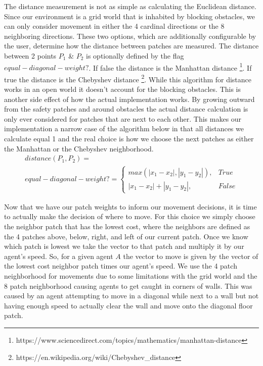 \documentclass[12pt,letterpaper]{article}
\begin{document}
The distance measurement is not as simple as calculating the Euclidean distance.  Since our environment is a grid world that is inhabited by blocking obstacles, we can only consider movement in either the 4 cardinal directions or the 8 neighboring directions.  These two options, which are additionally configurable by the user, determine how the distance between patches are measured.  The distance between 2 points $P_1$ \& $P_2$ is optionally defined by the flag $equal-diagonal-weight?$.  If false the distance is the Manhattan distance \footnote{ https://www.sciencedirect.com/topics/mathematics/manhattan-distance}. If true the distance is the Chebyshev distance \footnote{https://en.wikipedia.org/wiki/Chebyshev\_distance}. While this algorithm for distance works in an open world it doesn't account for the blocking obstacles.  This is another side effect of how the actual implementation works.  By growing outward from the safety patches and around obstacles the actual distance calculation is only ever considered for patches that are next to each other.  This makes our implementation a narrow case of the algorithm below in that all distances we calculate equal 1 and the real choice is how we choose the next patches as either the Manhattan or the Chebyshev neighborhood.
\begin{align}
distance(P_1, P_2)  = \nonumber\\
equal-diagonal-weight?=
\begin{cases}
	max(|x_1-x_2|, |y_1-y_2|), & True \\
	|x_1-x_2|+ |y_1-y_2|, & False
\end{cases}
\label{cost}
\end{align}

Now that we have our patch weights to inform our movement decisions, it is time to actually make the decision of where to move.  For this choice we simply choose the neighbor patch that has the lowest cost, where the neighbors are defined as the 4 patches above, below, right, and left of our current patch.  Once we know which patch is lowest we take the vector to that patch and multiply it by our agent's speed.  So, for a given agent $A$ the vector to move is given by the vector of the lowest cost neighbor patch times our agent's speed. We use the 4 patch neighborhood for movements due to some limitations with the grid world and the 8 patch neighborhood causing agents to get caught in corners of walls.  This was caused by an agent attempting to move in a diagonal while next to a wall but not having enough speed to actually clear the wall and move onto the diagonal floor patch.
\end{document}
